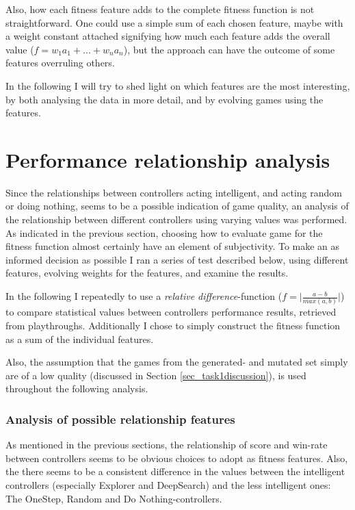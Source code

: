 \documentclass[a4paper,titlepage,final]{report}
\begin{document}
Also, how each fitness feature adds to the complete fitness function is not straightforward.
One could use a simple sum of each chosen feature, maybe with a weight constant attached signifying how much each feature adds the overall value ($f = w_1a_1+...+w_na_n$), but the approach can have the outcome of some features overruling others.

In the following I will try to shed light on which features are the most interesting, by both analysing the data in more detail, and by evolving games using the features.



\section{Performance relationship analysis}
\label{sec_task2fitnessSelection}
Since the relationships between controllers acting intelligent, and acting random or doing nothing, seems to be a possible indication of game quality, an analysis of the relationship between different controllers using varying values was performed.
As indicated in the previous section, choosing how to evaluate game for the fitness function almost certainly have an element of  subjectivity. 
To make an as informed decision as possible I ran a series of test described below, using different features, evolving weights for the features, and examine the results.

In the following I repeatedly to use a \textit{relative difference}-function ($f=\lvert\frac{a-b}{max(a,b)}\rvert$) to compare statistical values  between controllers performance results, retrieved from playthroughs.
Additionally I chose to simply construct the fitness function as a sum of the individual features.

Also, the assumption that the games from the generated- and mutated set simply are of a low quality (discussed in Section \ref{sec_task1discussion}), is used throughout the following analysis.

\subsubsection*{Analysis of possible relationship features}
As mentioned in the previous sections, the relationship of score and win-rate between controllers seems to be obvious choices to adopt as fitness features.
Also, the there seems to be a consistent difference in the values between the intelligent controllers (especially Explorer and DeepSearch) and the less intelligent ones: The OneStep, Random and Do Nothing-controllers.
\end{document}
